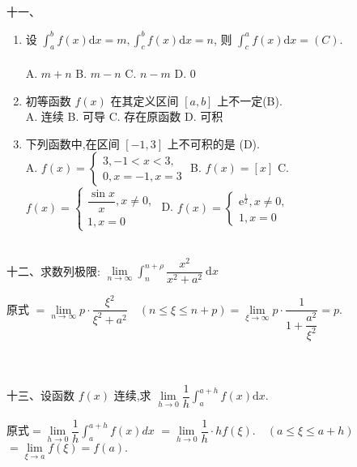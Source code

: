 \documentclass[lang=cn,newtx,10pt,scheme=chinese]{elegantbook}
\begin{document}
~\\
十一、
\begin{enumerate}
	\item 设 $\displaystyle\int_a^b f(x) \mathrm{d} x=m, \int_c^b f(x) \mathrm{d} x=n$, 则 $\displaystyle\int_c^a f(x) \mathrm{d} x=(C)$.\\
	~\\
	A. $m+n$\qquad
	B. $m-n$\qquad
	C. $n-m$\qquad
	D. 0\\
	
\item 初等函数 $f(x)$ 在其定义区间 $[a, b]$ 上不一定(B).\\
A. 连续\qquad
B. 可导\qquad
C. 存在原函数\qquad
D. 可积\\


\item 下列函数中,在区间 $[-1,3]$ 上不可积的是 (D).\\
A. $f(x)=\left\{\begin{array}{l}3,-1<x<3, \\ 0, x=-1, x=3\end{array}\right.$\quad
B. $f(x)=[x]$\quad
C. $f(x)=\left\{\begin{array}{l}\dfrac{\sin x}{x}, x \neq 0, \\ 1, x=0\end{array}\right.$\quad
D. $f(x)=\left\{\begin{array}{l}\mathrm{e}^{\frac{1}{2}}, x \neq 0, \\ 1, x=0\end{array}\right.$\\
\end{enumerate}

~\\
十二、求数列极限: $\displaystyle\lim\limits _{n \rightarrow \infty} \int_n^{n+\rho} \dfrac{x^2}{x^2+a^2} \mathrm{~d} x$\\


\begin{solution}
	原式 $=\lim\limits _{n \rightarrow \infty} p \cdot \dfrac{\xi^2}{\xi^2+a^2} \quad(n \leqslant \xi \leqslant n+p)=\lim\limits _{\xi \rightarrow \infty} p \cdot \dfrac{1}{1+\dfrac{a^2}{\xi^2}}=p.$ \\
	~\\
\end{solution}

~\\
十三、设函数 $f(x)$ 连续,求 $\lim\limits _{h \rightarrow 0} \dfrac{1}{h} \displaystyle\int_a^{a+h} f(x) \mathrm{d} x$.\\
\begin{solution}
	 原式$=\lim\limits _{h \rightarrow 0} \dfrac{1}{h} \displaystyle\int_a^{a+h} f(x) d x $
	$=\lim\limits_{h \rightarrow 0} \dfrac{1}{h} \cdot hf(\xi).\quad(a \leqslant \xi \leqslant a+h) $
	$=\lim\limits _{\xi\rightarrow a} f(\xi)=  f(a).$
\end{solution}
\end{document}
